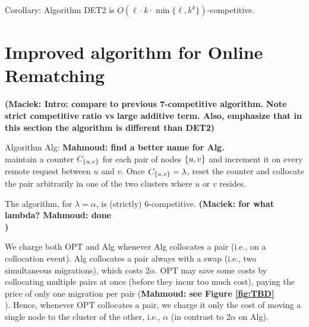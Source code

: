 \documentclass[manuscript,screen=true, review, anonymous]{acmart}
\DeclarePairedDelimiter\set{\{}{\}}
\newcommand\mahmoud[1]{\color{orange}\textbf{Mahmoud: #1}\\\color{black}}
\newcommand\maciek[1]{\color{brown}\textbf{(Maciek: #1)}\color{black}}
\begin{document}
Corollary: Algorithm DET2 is $O(\ell \cdot k \cdot \min \{ \ell, k^k \})$-competitive.



\section{Improved algorithm for Online Rematching}
\label{sec:k2}



\maciek{Intro: compare to previous 7-competitive algorithm. Note strict competitive ratio vs large additive term. Also, emphasize that in this section the algorithm is different than DET2}

Algorithm Alg:
\mahmoud{find a better name for Alg.}
maintain a counter $C_{\set{u,v}}$ for each pair of nodes $\set{u,v}$ and increment it on every remote request between $u$ and $v$.
Once $C_{\set{u,v}} = \lambda$,
reset the counter and collocate the pair arbitrarily in one of the two clusters where $u$ or $v$ resides.

\begin{theorem} \label{thm:k=2}
	The algorithm, for $\lambda=\alpha$, is (strictly) 6-competitive.
	\maciek{for what lambda? \mahmoud{done}}
\end{theorem}


We charge both OPT and Alg whenever Alg collocates a pair (i.e., on a collocation event).
Alg collocates a pair always with a swap (i.e., two simultaneous migrations),
which  costs $2\alpha$.
OPT may save some costs by collocating multiple pairs at once (before they incur too much cost),
paying the price of only one migration per pair  (\mahmoud{see Figure \ref{fig:TBD}}).
Hence,
whenever OPT collocates a pair,
we charge it only the cost of moving a single node to the cluster of the other,
i.e., $\alpha$ (in contrast to $2\alpha$ on Alg).
\end{document}
